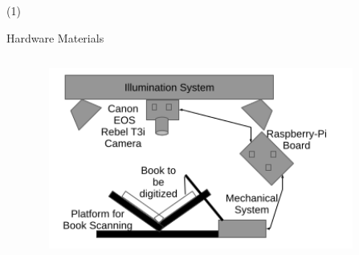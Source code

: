 \begin{frame}{  (1)}
\begin{block}{Hardware Materials}
\begin{columns}
\begin{column}{0.35\textwidth}
\begin{center}
        \end{center}
\end{column}
\begin{column}{0.43\textwidth}  
     \includegraphics[width=0.95\textwidth]{Figs/BookScanner1}
\end{column}
\begin{column}{0.23\textwidth}  


\end{column}
\end{columns}
\end{block}
\end{frame}
